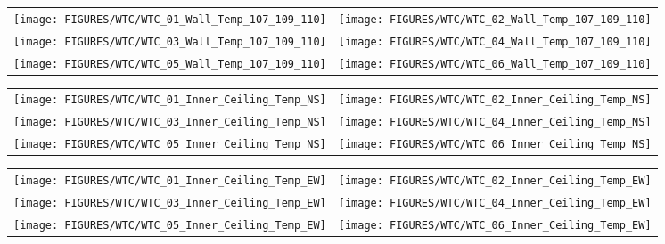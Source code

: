 \begin{figure}[p]
\begin{tabular*}{\textwidth}{l@{\extracolsep{\fill}}r}
\texttt{[image: FIGURES/WTC/WTC\_01\_Wall\_Temp\_107\_109\_110]} &
\texttt{[image: FIGURES/WTC/WTC\_02\_Wall\_Temp\_107\_109\_110]} \\
\texttt{[image: FIGURES/WTC/WTC\_03\_Wall\_Temp\_107\_109\_110]} &
\texttt{[image: FIGURES/WTC/WTC\_04\_Wall\_Temp\_107\_109\_110]} \\
\texttt{[image: FIGURES/WTC/WTC\_05\_Wall\_Temp\_107\_109\_110]} &
\texttt{[image: FIGURES/WTC/WTC\_06\_Wall\_Temp\_107\_109\_110]}
\end{tabular*}
\label{NIST_WTC_Wall_107_109_110}
\end{figure}

\begin{figure}[p]
\begin{tabular*}{\textwidth}{l@{\extracolsep{\fill}}r}
\texttt{[image: FIGURES/WTC/WTC\_01\_Inner\_Ceiling\_Temp\_NS]} &
\texttt{[image: FIGURES/WTC/WTC\_02\_Inner\_Ceiling\_Temp\_NS]} \\
\texttt{[image: FIGURES/WTC/WTC\_03\_Inner\_Ceiling\_Temp\_NS]} &
\texttt{[image: FIGURES/WTC/WTC\_04\_Inner\_Ceiling\_Temp\_NS]} \\
\texttt{[image: FIGURES/WTC/WTC\_05\_Inner\_Ceiling\_Temp\_NS]} &
\texttt{[image: FIGURES/WTC/WTC\_06\_Inner\_Ceiling\_Temp\_NS]}
\end{tabular*}
\label{NIST_WTC_Inner_Ceiling_NS}
\end{figure}

\begin{figure}[p]
\begin{tabular*}{\textwidth}{l@{\extracolsep{\fill}}r}
\texttt{[image: FIGURES/WTC/WTC\_01\_Inner\_Ceiling\_Temp\_EW]} &
\texttt{[image: FIGURES/WTC/WTC\_02\_Inner\_Ceiling\_Temp\_EW]} \\
\texttt{[image: FIGURES/WTC/WTC\_03\_Inner\_Ceiling\_Temp\_EW]} &
\texttt{[image: FIGURES/WTC/WTC\_04\_Inner\_Ceiling\_Temp\_EW]} \\
\texttt{[image: FIGURES/WTC/WTC\_05\_Inner\_Ceiling\_Temp\_EW]} &
\texttt{[image: FIGURES/WTC/WTC\_06\_Inner\_Ceiling\_Temp\_EW]}
\end{tabular*}
\label{NIST_WTC_Inner_Ceiling_EW}
\end{figure}

